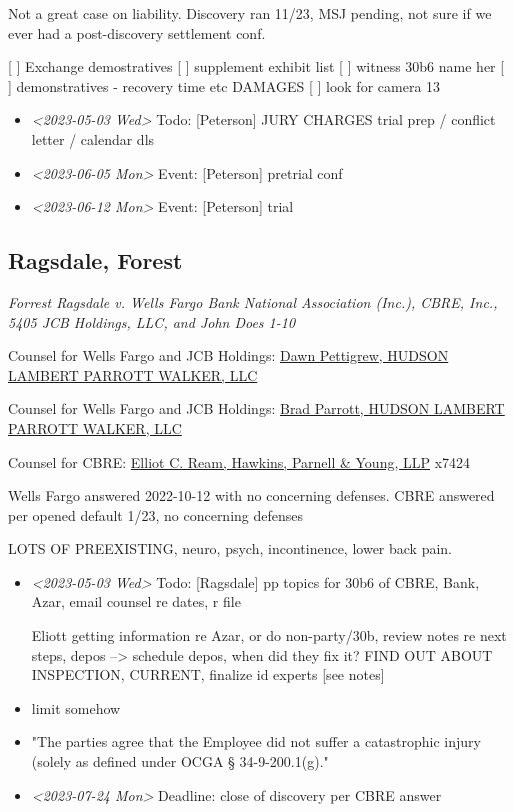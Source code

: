 \documentclass[11pt]{article}
\begin{document}
Not a great case on liability. Discovery ran 11/23, MSJ pending, not sure if we ever had a post-discovery settlement conf.

[ ] Exchange demostratives
[ ] supplement exhibit list
[ ] witness 30b6 name her
[ ] demonstratives - recovery time etc DAMAGES
[ ] look for camera 13

\begin{itemize}
\item \textit{<2023-05-03 Wed> } Todo: [Peterson] JURY CHARGES trial prep / conflict letter / calendar dls

\item \textit{<2023-06-05 Mon> } Event: [Peterson] pretrial conf

\item \textit{<2023-06-12 Mon> } Event: [Peterson] trial
\end{itemize}

\subsection*{Ragsdale, Forest}
\label{sec:org1870cae}

\emph{Forrest Ragsdale v. Wells Fargo Bank National Association (Inc.), CBRE, Inc., 5405 JCB Holdings, LLC, and John Does 1-10}

Counsel for Wells Fargo and JCB Holdings: \href{https://www.gabar.org/MemberSearchDetail.cfm?ID=NDA5NTA5}{Dawn Pettigrew, HUDSON LAMBERT PARROTT WALKER, LLC}

Counsel for Wells Fargo and JCB Holdings: \href{https://www.gabar.org/MemberSearchDetail.cfm?ID=NTk1OTk5}{Brad Parrott, HUDSON LAMBERT PARROTT WALKER, LLC}

Counsel for CBRE: \href{https://www.gabar.org/MemberSearchDetail.cfm?ID=NTI4Mjgx}{Elliot C. Ream, Hawkins, Parnell \& Young, LLP} x7424

Wells Fargo answered 2022-10-12 with no concerning defenses. CBRE answered per opened default 1/23, no concerning defenses

LOTS OF PREEXISTING, neuro, psych, incontinence, lower back pain.

\begin{itemize}
\item \textit{<2023-05-03 Wed> } Todo: [Ragsdale] pp topics for 30b6 of CBRE, Bank, Azar, email counsel re dates, r file

Eliott getting information re Azar, or do non-party/30b, review notes re next steps, depos --> schedule depos, when did they fix it? FIND OUT ABOUT INSPECTION, CURRENT, finalize id experts [see notes]

\item limit somehow
\item "The parties agree that the Employee did not suffer a catastrophic injury (solely as defined under OCGA § 34-9-200.1(g)."

\item \textit{<2023-07-24 Mon> } Deadline: close of discovery per CBRE answer
\end{itemize}
\end{document}
